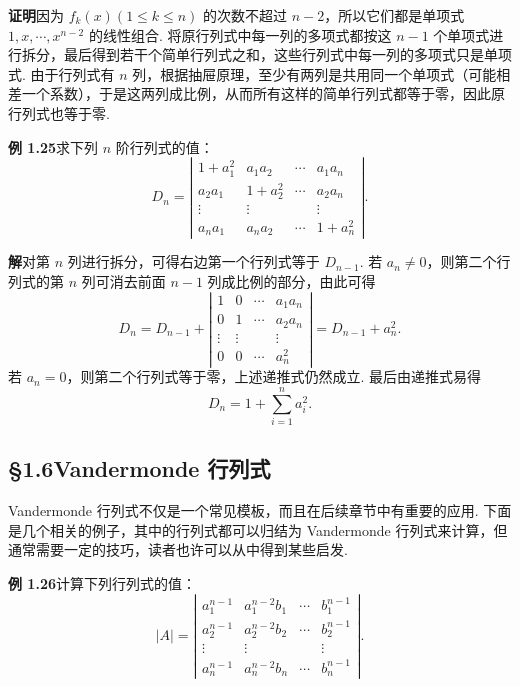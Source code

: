 \documentclass[UTF8,12pt,a4paper,fontset=fandol]{ctexart}
\begin{document}
\noindent\textbf{证明}\quad 因为 $f_k(x)(1\le k\le n)$ 的次数不超过 $n-2$，所以它们都是单项式 $1,x,\cdots,x^{n-2}$ 的线性组合. 将原行列式中每一列的多项式都按这 $n-1$ 个单项式进行拆分，最后得到若干个简单行列式之和，这些行列式中每一列的多项式只是单项式. 由于行列式有 $n$ 列，根据抽屉原理，至少有两列是共用同一个单项式（可能相差一个系数），于是这两列成比例，从而所有这样的简单行列式都等于零，因此原行列式也等于零.

\noindent\textbf{例 1.25}\quad 求下列 $n$ 阶行列式的值：
\[
D_n=\left|\begin{array}{cccc}
1+a_1^2 & a_1a_2 & \cdots & a_1a_n\\
a_2a_1 & 1+a_2^2 & \cdots & a_2a_n\\
\vdots & \vdots &        & \vdots\\
a_na_1 & a_na_2 & \cdots & 1+a_n^2
\end{array}\right|.
\]

\noindent\textbf{解}\quad 对第 $n$ 列进行拆分，可得右边第一个行列式等于 $D_{n-1}$. 若 $a_n\ne0$，则第二个行列式的第 $n$ 列可消去前面 $n-1$ 列成比例的部分，由此可得
\[
D_n=D_{n-1}+
\left|\begin{array}{cccc}
1 & 0 & \cdots & a_1a_n\\
0 & 1 & \cdots & a_2a_n\\
\vdots & \vdots &        & \vdots\\
0 & 0 & \cdots & a_n^2
\end{array}\right|
=D_{n-1}+a_n^2.
\]
若 $a_n=0$，则第二个行列式等于零，上述递推式仍然成立. 最后由递推式易得
\[
D_n=1+\sum_{i=1}^n a_i^2.
\]

\subsection*{§1.6\quad Vandermonde 行列式}

Vandermonde 行列式不仅是一个常见模板，而且在后续章节中有重要的应用. 下面是几个相关的例子，其中的行列式都可以归结为 Vandermonde 行列式来计算，但通常需要一定的技巧，读者也许可以从中得到某些启发.

\noindent\textbf{例 1.26}\quad 计算下列行列式的值：
\[
|A|=\left|\begin{array}{cccc}
a_1^{n-1} & a_1^{n-2}b_1 & \cdots & b_1^{n-1}\\
a_2^{n-1} & a_2^{n-2}b_2 & \cdots & b_2^{n-1}\\
\vdots & \vdots &        & \vdots\\
a_n^{n-1} & a_n^{n-2}b_n & \cdots & b_n^{n-1}
\end{array}\right|.
\]
\end{document}

